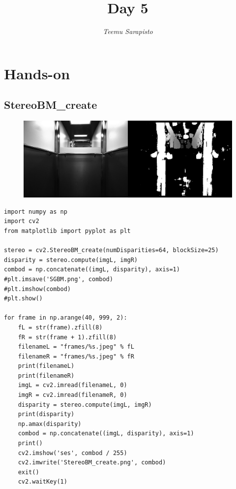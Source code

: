\documentclass{article}
\begin{document}
\title{Day 5}

\author{\emph{Teemu Sarapisto}}
\maketitle

\newcommand{\aaa}[3]{%
  \fbox{\texttt{[image: \#1]}} \quad
  \fbox{\texttt{[image: \#2]}} \quad
  \fbox{\texttt{[image: \#3]}} \par}
\newcommand{\bbb}[3]{%
  \medskip\noindent\aaa{#1}{#1-#2}{#1-#3}}

\newpage

\setlength{\fboxsep}{0pt}%

\section{Hands-on}

\subsection{StereoBM\_create}
\begin{figure}[h]
    \centering
    \includegraphics[scale=0.30]{StereoBM_create}
\end{figure}
\begin{verbatim}
import numpy as np
import cv2
from matplotlib import pyplot as plt

stereo = cv2.StereoBM_create(numDisparities=64, blockSize=25)
disparity = stereo.compute(imgL, imgR)
combod = np.concatenate((imgL, disparity), axis=1)
#plt.imsave('SGBM.png', combod)
#plt.imshow(combod)
#plt.show()

for frame in np.arange(40, 999, 2):
    fL = str(frame).zfill(8)
    fR = str(frame + 1).zfill(8)
    filenameL = "frames/%s.jpeg" % fL
    filenameR = "frames/%s.jpeg" % fR
    print(filenameL)
    print(filenameR)
    imgL = cv2.imread(filenameL, 0)
    imgR = cv2.imread(filenameR, 0)
    disparity = stereo.compute(imgL, imgR)
    print(disparity)
    np.amax(disparity)
    combod = np.concatenate((imgL, disparity), axis=1)
    print()
    cv2.imshow('ses', combod / 255)
    cv2.imwrite('StereoBM_create.png', combod)
    exit()
    cv2.waitKey(1)
\end{verbatim}
\end{document}
